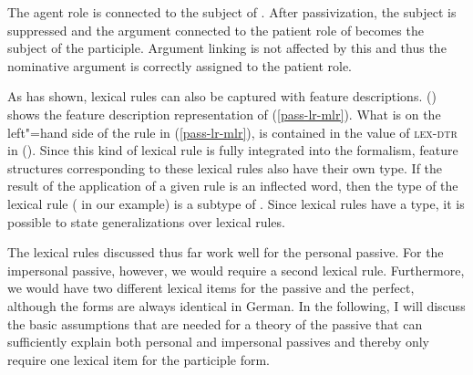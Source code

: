 \zl
The agent role is connected to the subject of . After passivization, the subject is suppressed and the argument connected to
the patient role of  becomes the subject of the participle. Argument linking is not affected by this and thus the nominative argument is
correctly assigned to the patient role.

As \citet{Meurers2001a} has shown, lexical rules can also be captured with feature
descriptions.\label{pageref-lr-mit-dtr} () shows the feature description representation of (\ref{pass-lr-mlr}).
\ea
\label{passiv-lr-mit-dtr}
\z
What is on the left"=hand side of the rule in (\ref{pass-lr-mlr}), is contained in the value of \textsc{lex-dtr} in ().
Since this kind of lexical rule is fully integrated into the formalism, feature structures corresponding to these lexical rules also have their own
type. If the result of the application of a given rule is an inflected word, then the type of the lexical rule ( in our example)
is a subtype of . Since lexical rules have a type, it is possible to state generalizations over lexical rules.

The lexical rules discussed thus far work well for the personal passive. For the impersonal passive,
however, we would require a second lexical rule. Furthermore, we would have two different lexical
items for the passive and the perfect, although the forms are always identical in German.  In the following,
I will discuss the basic assumptions that are needed for a theory of the passive that can sufficiently
explain both personal and impersonal passives and thereby only require one lexical item for the
participle form.

